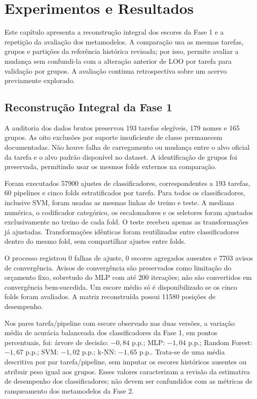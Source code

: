 \chapter{Experimentos e Resultados}\label{cap:experimentos}

Este capítulo apresenta a reconstrução integral dos escores da Fase 1 e a repetição da avaliação dos metamodelos. A comparação usa as mesmas tarefas, grupos e partições da referência histórica revisada; por isso, permite avaliar a mudança sem confundi-la com a alteração anterior de LOO por tarefa para validação por grupos. A avaliação continua retrospectiva sobre um acervo previamente explorado.

\section{Reconstrução Integral da Fase 1}

A auditoria dos dados brutos preservou 193 tarefas elegíveis, 179 nomes e 165 grupos. As oito exclusões por suporte insuficiente de classe permanecem documentadas. Não houve falha de carregamento ou mudança entre o alvo oficial da tarefa e o alvo padrão disponível no dataset. A identificação de grupos foi preservada, permitindo usar os mesmos folds externos na comparação.

Foram executados 57900 ajustes de classificadores, correspondentes a 193 tarefas, 60 pipelines e cinco folds estratificados por tarefa. Para todos os classificadores, inclusive SVM, foram usadas as mesmas linhas de treino e teste. A mediana numérica, o codificador categórico, os escalonadores e os seletores foram ajustados exclusivamente no treino de cada fold. O teste recebeu apenas as transformações já ajustadas. Transformações idênticas foram reutilizadas entre classificadores dentro do mesmo fold, sem compartilhar ajustes entre folds.

O processo registrou 0 falhas de ajuste, 0 escores agregados ausentes e 7703 avisos de convergência. Avisos de convergência são preservados como limitação do orçamento fixo, sobretudo do MLP com até 200 iterações; não são convertidos em convergência bem-sucedida. Um escore médio só é disponibilizado se os cinco folds foram avaliados. A matriz reconstruída possui 11580 posições de desempenho.

Nos pares tarefa/pipeline com escore observado nas duas versões, a variação média de acurácia balanceada dos classificadores da Fase 1, em pontos percentuais, foi: árvore de decisão: $-0{,}84$ p.p.; MLP: $-1{,}04$ p.p.; Random Forest: $-1{,}67$ p.p.; SVM: $-1{,}02$ p.p.; k-NN: $-1{,}65$ p.p.. Trata-se de uma média descritiva por par tarefa/pipeline, sem imputar os escores históricos ausentes ou atribuir peso igual aos grupos. Esses valores caracterizam a revisão da estimativa de desempenho dos classificadores; não devem ser confundidos com as métricas de ranqueamento dos metamodelos da Fase 2.

